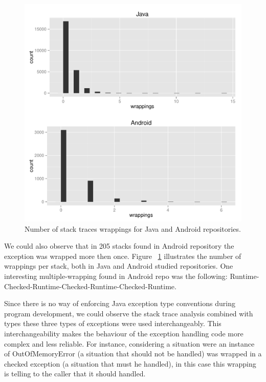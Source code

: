 \documentclass[conference]{IEEEtran}
\begin{document}

\begin{figure}
  \begin{center}
    \includegraphics[scale=0.4]{stack-wrappings-hist.pdf}
  \end{center}
  \caption{Number of stack traces wrappings for Java and Android repositories. }
  \label{fig:sizewrapbhists}
\end{figure}

We could also observe that in 205 stacks found in Android repository the exception was wrapped 
more then once. Figure ~\ref{fig:sizewrapbhists}  illustrates the number of wrappings per stack, both
 in Java and Android studied repositories. One interesting multiple-wrapping found in Android repo was the 
following: Runtime-Checked-Runtime-Checked-Runtime-Checked-Runtime.

Since there is no way of enforcing Java exception type conventions during program development,
we could observe the stack trace analysis combined with types these three types
of exceptions were used interchangeably. This interchangeability makes the
behaviour of the exception handling code more complex and less reliable. For
instance, considering a situation were an instance of OutOfMemoryError (a situation that
should not be handled) was wrapped in a checked exception (a situation that must
he handled), in this case this wrapping is telling to the caller that it should
handled.
\end{document}
